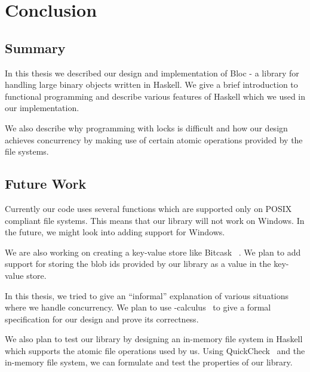 \chapter{Conclusion}
\label{chap:conclusion}

\section{Summary}
In this thesis we described our design and implementation of Bloc - a library for handling large binary objects written in Haskell. We give a brief introduction to functional programming and describe various features of Haskell which we used in our implementation.

We also describe why programming with locks is difficult and how our design achieves concurrency by making use of certain atomic operations provided by the file systems.

\section{Future Work}
Currently our code uses several functions which are supported only on POSIX compliant file systems. This means that our library will not work on Windows. In the future, we might look into adding support for Windows.

We are also working on creating a key-value store like Bitcask ~\cite{sheehy2010bitcask}. We plan to add support for storing the blob ids provided by our library as a value in the key-value store.

In this thesis, we tried to give an ``informal'' explanation of various situations where we handle concurrency. We plan to use \pi-calculus~\cite{milner1999communicating} to give a formal specification for our design and prove its correctness.

We also plan to test our library by designing an in-memory file system in Haskell which supports the atomic file operations used by us. Using QuickCheck~\cite{claessen2011quickcheck} and the in-memory file system, we can formulate and test the properties of our library.
